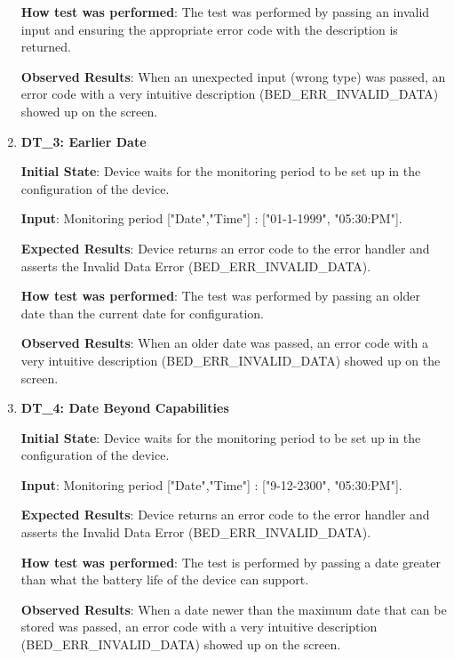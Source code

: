 \documentclass[12pt, titlepage]{article}
\begin{document}
\begin{enumerate}
  \textbf{How test was performed}: The test was performed by passing an invalid input and ensuring the appropriate error code with the description is returned.

  \textbf{Observed Results}: When an unexpected input (wrong type) was passed, an error code with a very intuitive description (BED\_ERR\_INVALID\_DATA) showed up on the screen.

  \item{\textbf{DT\_3: Earlier Date}\\}\label{DT3}

  \textbf{Initial State}: Device waits for the monitoring period to be set up in the configuration of the device.

  \textbf{Input}: Monitoring period ["Date","Time"] : ["01-1-1999", "05:30:PM"].

  \textbf{Expected Results}: Device returns an error code to the error handler and asserts the Invalid Data Error (BED\_ERR\_INVALID\_DATA).

  \textbf{How test was performed}: The test was performed by passing an older date than the current date for configuration.

  \textbf{Observed Results}: When an older date was passed, an error code with a very intuitive description (BED\_ERR\_INVALID\_DATA) showed up on the screen.

  \item{\textbf{DT\_4: Date Beyond Capabilities}\\}\label{DT4}

  \textbf{Initial State}: Device waits for the monitoring period to be set up in the configuration of the device.

  \textbf{Input}: Monitoring period ["Date","Time"] : ["9-12-2300", "05:30:PM"].

  \textbf{Expected Results}: Device returns an error code to the error handler and asserts the Invalid Data Error (BED\_ERR\_INVALID\_DATA).

  \textbf{How test was performed}: The test is performed by passing a date greater than what the battery life of the device can support.

  \textbf{Observed Results}: When a date newer than the maximum date that can be stored was passed, an error code with a very intuitive description (BED\_ERR\_INVALID\_DATA) showed up on the screen.
\end{enumerate}

\end{document}
